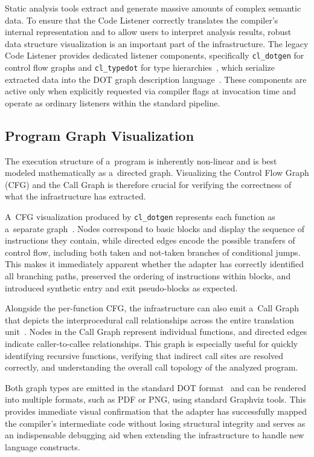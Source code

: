 \documentclass[xpsejal00-gcc-plugin.tex]{subfiles}
\begin{document}
Static analysis tools extract and generate massive amounts of complex semantic data.
To ensure that the Code Listener correctly translates the compiler's internal representation and to allow users to interpret analysis results, robust data structure visualization is an important part of the infrastructure.
The legacy Code Listener provides dedicated listener components, specifically \texttt{cl\_dotgen} for control flow graphs and \texttt{cl\_typedot} for type hierarchies~\cite{CodeListener2012}, which serialize extracted data into the DOT graph description language~\cite{Graphviz}.
These components are active only when explicitly requested via compiler flags at invocation time and operate as ordinary listeners within the standard pipeline.

\subsection*{Program Graph Visualization}\label{sub:program-graph}

The execution structure of a~program is inherently non-linear and is best modeled mathematically as a~directed graph.
Visualizing the Control Flow Graph (CFG) and the Call Graph is therefore crucial for verifying the correctness of what the infrastructure has extracted.

A~CFG visualization produced by \texttt{cl\_dotgen} represents each function as a~separate graph~\cite{CodeListener2012}.
Nodes correspond to basic blocks and display the sequence of instructions they contain, while directed edges encode the possible transfers of control flow, including both taken and not-taken branches of conditional jumps.
This makes it immediately apparent whether the adapter has correctly identified all branching paths, preserved the ordering of instructions within blocks, and introduced synthetic entry and exit pseudo-blocks as expected.

Alongside the per-function CFG, the infrastructure can also emit a~Call Graph that depicts the interprocedural call relationships across the entire translation unit~\cite{CodeListener2012}.
Nodes in the Call Graph represent individual functions, and directed edges indicate caller-to-callee relationships.
This graph is especially useful for quickly identifying recursive functions, verifying that indirect call sites are resolved correctly, and understanding the overall call topology of the analyzed program.

Both graph types are emitted in the standard DOT format~\cite{Graphviz} and can be rendered into multiple formats, such as PDF or PNG, using standard Graphviz tools.
This provides immediate visual confirmation that the adapter has successfully mapped the compiler's intermediate code without losing structural integrity and serves as an indispensable debugging aid when extending the infrastructure to handle new language constructs.
\end{document}
